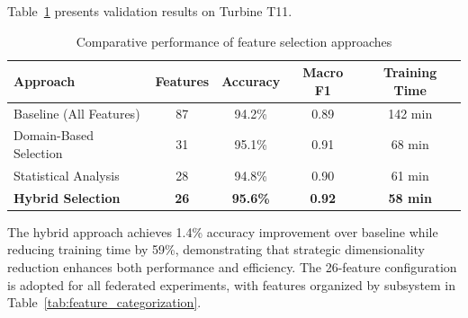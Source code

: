 \documentclass[12pt]{article}
\begin{document}
Table~\ref{tab:feature_selection_comparison} presents validation results on Turbine T11.

\begin{table}[htbp]
\centering
\caption{Comparative performance of feature selection approaches}
\label{tab:feature_selection_comparison}
\begin{tabular}{lcccc}
\toprule
\textbf{Approach} & \textbf{Features} & \textbf{Accuracy} & \textbf{Macro F1} & \textbf{Training Time} \\
\midrule
Baseline (All Features) & 87 & 94.2\% & 0.89 & 142 min \\
Domain-Based Selection & 31 & 95.1\% & 0.91 & 68 min \\
Statistical Analysis & 28 & 94.8\% & 0.90 & 61 min \\
\textbf{Hybrid Selection} & \textbf{26} & \textbf{95.6\%} & \textbf{0.92} & \textbf{58 min} \\
\bottomrule
\end{tabular}
\end{table}

The hybrid approach achieves 1.4\% accuracy improvement over baseline while reducing training time by 59\%, demonstrating that strategic dimensionality reduction enhances both performance and efficiency. The 26-feature configuration is adopted for all federated experiments, with features organized by subsystem in Table~\ref{tab:feature_categorization}.



\end{document}

